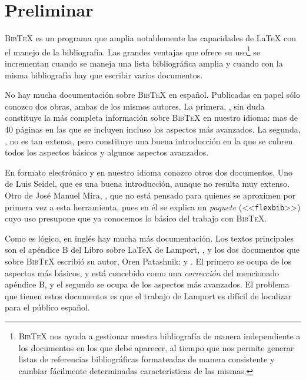 \documentclass[a4paper,11pt]{article}
\def\btx-{\textsc{Bib\TeX}}
\def\ltx-{\LaTeX}
\def\ltr#1-{<<\texttt{#1}>>}
\begin{document}
{\parskip=0pt\small\tableofcontents}

\section*{Preliminar}
\label{sec:preliminar}


\btx- es un  programa que amplia notablemente las capacidades  de \ltx- con el
manejo de  la bibliografía. Las  grandes ventajas que ofrece  su uso\footnote{
  \btx- nos ayuda  a gestionar nuestra bibliografía de  manera independiente a
  los documentos en  los que debe aparecer, al tiempo  que nos permite generar
  listas  de referencias  bibliográficas formateadas  de manera  consistente y
  cambiar  fácilmente  determinadas  características  de las  mismas.   }   se
incrementan cuando  se maneja una lista  bibliográfica amplia y  cuando con la
misma bibliografía hay que escribir varios documentos.

No hay  mucha documentación sobre \btx-  en español. Publicadas  en papel sólo
conozco dos obras, ambas de los mismos autores. La primera, \cite{cascales00},
sin duda constituye la más completa información sobre \btx- en nuestro idioma:
mas de 40  páginas en las que se incluyen incluso  los aspectos más avanzados.
La segunda,  \cite{cascales03}, no es  tan extensa, pero constituye  una buena
introducción en la que se cubren todos los aspectos básicos y algunos aspectos
avanzados.

En formato electrónico  y en nuestro idioma conozco  otros dos documentos. Uno
de  Luis Seidel,  \cite{seidel98} que  es  una buena  introducción, aunque  no
resulta muy  extenso.  Otro  de José Manuel  Mira, \cite{mira04}, que  no está
pensado para quienes se aproximen por  primera vez a esta herramienta, pues en
él  se explica un  \emph{paquete} (\ltr  flexbib-) cuyo  uso presupone  que ya
conocemos lo básico del trabajo con \btx-.

Como es lógico, en inglés  hay mucha más documentación. Los textos principales
son el  apéndice B del Libro  sobre \ltx- de Lamport,  \cite{lamport86}, y los
dos   documentos  que  sobre   \btx-  escribió   su  autor,   Oren  Patashnik:
\cite{patashnik88} y \cite{patashnik88-2}. El primero se ocupa de los aspectos
más  básicos,  y está  concebido  como  una  \emph{corrección} del  mencionado
apéndice B, y el segundo se  ocupa de los aspectos más avanzados.  El problema
que  tienen estos  documentos  es que  el  trabajo de  Lamport  es difícil  de
localizar para el público español.
\end{document}
